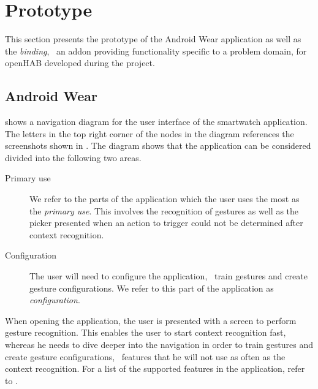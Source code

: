 \section{Prototype}
\label{sec:implementation:prototype}

This section presents the prototype of the Android Wear application as well as the \emph{binding}, \ie~an addon providing functionality specific to a problem domain, for openHAB developed during the project.

\subsection{Android Wear}
\label{sec:implementation:prototype:android-wear}

 shows a navigation diagram for the user interface of the smartwatch application. The letters in the top right corner of the nodes in the diagram references the screenshots shown in . The diagram shows that the application can be considered divided into the following two areas.

\begin{description}
\item[Primary use] We refer to the parts of the application which the user uses the most as the \emph{primary use}. This involves the recognition of gestures as well as the picker presented when an action to trigger could not be determined after context recognition.
\item[Configuration] The user will need to configure the application, \ie~train gestures and create gesture configurations. We refer to this part of the application as \emph{configuration}.
\end{description}

When opening the application, the user is presented with a screen to perform gesture recognition. This enables the user to start context recognition fast, whereas he needs to dive deeper into the navigation in order to train gestures and create gesture configurations, \ie~features that he will not use as often as the context recognition. For a list of the supported features in the application, refer to .


